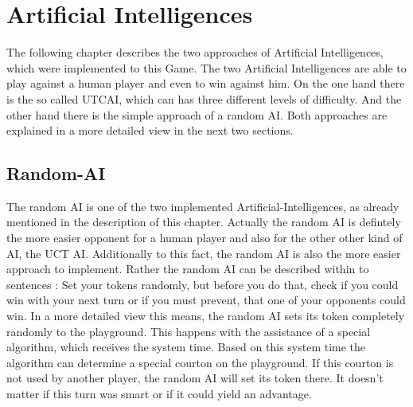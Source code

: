 \documentclass[english]{report}
\begin{document}
\chapter{Artificial Intelligences}
\label{sec:artificIntelligences}
The following chapter describes the two approaches of Artificial Intelligences, which were implemented to this Game. The two Artificial Intelligences are able 
to play against a human player and even to win against him. On the one hand there is the so called UTCAI, which can has three different
levels of difficulty. And the other hand there is the simple approach of a random AI. Both approaches are explained in a more detailed view in the next two
sections. 



\section{Random-AI}
The random AI is one of the two implemented Artificial-Intelligences, as already mentioned in the description of this chapter. 
Actually the random AI is defintely the more easier opponent for a human player and also for the other other kind of AI, the UCT AI. 
Additionally to this fact, the random AI is also the more easier approach to implement. Rather the random AI can be described within to sentences : 
Set your tokens randomly, but before you do that, check if you could  win with your next turn or if you must prevent, that one of your opponents could win. 
In a more detailed view this means, the random AI sets its token completely randomly to the playground. This happens with the assistance of a special algorithm, 
which receives the system time. Based on this system time the algorithm can determine a special courton on the playground. If this courton is not used by 
another player, the random AI will set its token there. It doesn't matter if this turn was smart or if it could yield an advantage. 
\end{document}
